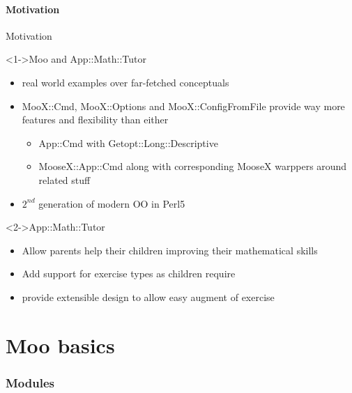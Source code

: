 \documentclass[ngerman,xcolor={table,dvipsnames},smaller,compress,hyperref={bookmarks,colorlinks}]{beamer}
\begin{document}
\subsection{Motivation}

\begin{frame}[t,fragile]{Motivation}

\begin{block}<1->{Moo and App::Math::Tutor}
\begin{itemize}
\item real world examples over far-fetched conceptuals
\item MooX::Cmd, MooX::Options and MooX::ConfigFromFile provide way more features and flexibility than either
      \begin{itemize}
      \item App::Cmd with Getopt::Long::Descriptive
      \item MooseX::App::Cmd along with corresponding MooseX warppers around related stuff
      \end{itemize}
\item $ 2^{nd} $ generation of modern OO in Perl5
\end{itemize}
\end{block}

\begin{block}<2->{App::Math::Tutor}
\begin{itemize}
\item Allow parents help their children improving their mathematical skills
\item Add support for exercise types as children require
\item provide extensible design to allow easy augment of exercise
\end{itemize}
\end{block}

\end{frame}

\part{Moo basics}

\section{Modules}
\end{document}
